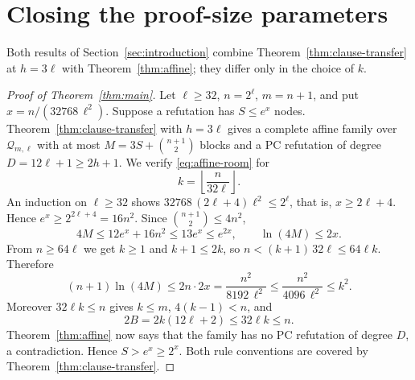 \section{Closing the proof-size parameters}\label{sec:main-proof}

Both results of Section~\ref{sec:introduction} combine
Theorem~\ref{thm:clause-transfer} at \(h=3\ell\) with
Theorem~\ref{thm:affine}; they differ only in the choice of \(k\).

\begin{proof}[Proof of Theorem~\ref{thm:main}]
Let \(\ell\ge32\), \(n=2^\ell\), \(m=n+1\), and put
\(x=n/(32768\,\ell^2)\). Suppose a refutation has \(S\le e^x\) nodes.
Theorem~\ref{thm:clause-transfer} with \(h=3\ell\) gives a complete affine
family over \(\mathcal Q_{m,\ell}\) with at most
\(M=3S+\binom{n+1}{2}\) blocks and a PC refutation of degree
\(D=12\ell+1\ge2h+1\). We verify \eqref{eq:affine-room} for
\[
 k=\left\lfloor\frac{n}{32\ell}\right\rfloor .
\]
An induction on \(\ell\ge32\) shows
\(32768\,(2\ell+4)\ell^2\le2^\ell\), that is, \(x\ge2\ell+4\). Hence
\(e^x\ge2^{2\ell+4}=16n^2\). Since \(\binom{n+1}2\le4n^2\),
\[
 4M\le12e^x+16n^2\le13e^x\le e^{2x},\qquad \ln(4M)\le2x .
\]
From \(n\ge64\ell\) we get \(k\ge1\) and \(k+1\le2k\), so
\(n<(k+1)\,32\ell\le64\ell k\). Therefore
\[
 (n+1)\ln(4M)\le2n\cdot2x=\frac{n^2}{8192\,\ell^2}
 \le\frac{n^2}{4096\,\ell^2}\le k^2 .
\]
Moreover \(32\ell k\le n\) gives \(k\le m\), \(4(k-1)<n\), and
\[
 2B=2k(12\ell+2)\le32\ell k\le n .
\]
Theorem~\ref{thm:affine} now says that the family has no PC refutation of
degree \(D\), a contradiction. Hence \(S>e^x\ge2^x\). Both rule conventions
are covered by Theorem~\ref{thm:clause-transfer}.
\end{proof}

